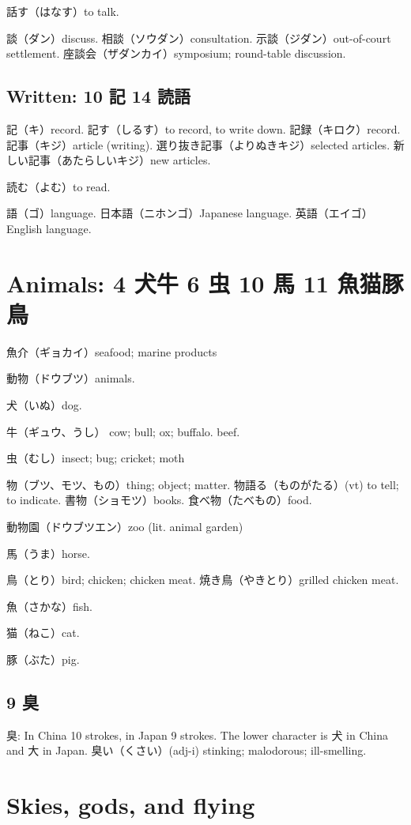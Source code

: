 話す（はなす）to talk.

談（ダン）discuss.
相談（ソウダン）consultation.
示談（ジダン）out-of-court settlement.
座談会（ザダンカイ）symposium; round-table discussion.

\subsection{Written: 10 記 14 読語}

記（キ）record.
記す（しるす）to record, to write down.
記録（キロク）record.
記事（キジ）article (writing).
選り抜き記事（よりぬきキジ）selected articles.
新しい記事（あたらしいキジ）new articles.

読む（よむ）to read.

語（ゴ）language.
日本語（ニホンゴ）Japanese language.
英語（エイゴ）English language.

\section{Animals: 4 犬牛 6 虫 10 馬 11 魚猫豚鳥}

魚介（ギョカイ）seafood; marine products

動物（ドウブツ）animals.

犬（いぬ）dog.

牛（ギュウ、うし）
cow; bull; ox; buffalo.
beef.

虫（むし）insect; bug; cricket; moth

物（ブツ、モツ、もの）thing; object; matter.
物語る（ものがたる）(vt) to tell; to indicate.
書物（ショモツ）books.
食べ物（たべもの）food.

動物園（ドウブツエン）zoo (lit. animal garden)

馬（うま）horse.

鳥（とり）bird; chicken; chicken meat.
焼き鳥（やきとり）grilled chicken meat.

魚（さかな）fish.

猫（ねこ）cat.

豚（ぶた）pig.

\subsection{9 臭}

臭: In China 10 strokes, in Japan 9 strokes.
The lower character is 犬 in China and 大 in Japan.
臭い（くさい）(adj-i) stinking; malodorous; ill-smelling.

\section{Skies, gods, and flying}

